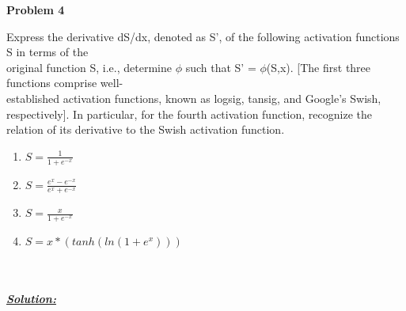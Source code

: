 \documentclass{article}
\begin{document}
\newpage
\noindent \textbf{Problem 4}

\noindent Express the derivative dS/dx, denoted as S', of the following activation functions S in terms of the \\ original function S, i.e., determine ${\phi}$ such that S' = ${\phi}$(S,x). 
[The first three functions comprise well-\\established activation functions, known as logsig, tansig, and Google's Swish, respectively]. In particular, for the fourth activation
function, recognize the relation of its derivative to the Swish activation function.\\
\begin{enumerate}
  \item $S = \frac{1}{1+e^{-x}}$ \\
  \item $S = \frac{e^{x}-e^{-x}}{e^{x}+e^{-x}}$ \\
  \item $S = \frac{x}{1+e^{-x}}$ \\
  \item $S = x*(tanh(ln(1+e^{x})))$ \\
\end{enumerate}
\noindent \\ \\ 
\underline{\textbf{\textit{Solution:}}}
\end{document}
